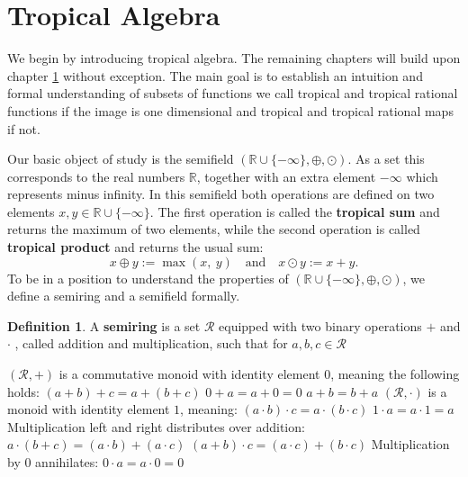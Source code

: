 \documentclass{article}
\theoremstyle{definition}
\newtheorem{definition}[theorem]{Definition}
\begin{document}
\section{Tropical Algebra}
\label{sec:trop_algebra}
We begin by introducing tropical algebra. The remaining chapters will build upon chapter \ref{sec:trop_algebra} without exception. The main goal is to establish an intuition and formal understanding of subsets of functions we call tropical and tropical rational functions if the image is one dimensional and tropical and tropical rational maps if not.

Our basic object of study is the semifield $( \mathbb{R} \cup \{- \infty \} , \oplus , \odot )$. As a set this corresponds to the real numbers $ \mathbb{R} $, together with an extra element $- \infty $ which represents minus infinity. In this semifield both operations are defined on two elements $x, y \in \mathbb{R} \cup \{- \infty \}$. The first operation is called the \textbf{tropical sum} and returns the maximum of two elements, while the second operation is called \textbf{tropical product} and returns the usual sum:
$$ x \oplus y := \max(x,\ y) \quad \text{and} \quad x \odot y := x+y.$$
To be in a position to understand the properties of $( \mathbb{R} \cup \{- \infty \} , \oplus , \odot )$, we define a semiring and a semifield formally.
\begin{definition}\cite{berstel1985theory}
A \textbf{semiring} is a set $\mathcal{R}$ equipped with two binary operations $+$ and $\cdot$ , called addition and multiplication, such that for $a, b, c \in \mathcal{R}$ \\
\begin{outline}
  \1 $(\mathcal{R}, +)$ is a commutative monoid with identity element 0, meaning the following holds:
    \2 $(a + b) + c = a + (b + c)$
    \2 $0 + a = a + 0 = 0$
    \2 $a + b = b + a$
  \1 $(\mathcal{R}, \cdot)$ is a monoid with identity element $1$, meaning:
    \2 $(a \cdot b) \cdot c = a \cdot (b \cdot c)$
    \2 $ 1 \cdot a = a \cdot 1 = a $
  \1 Multiplication left and right distributes over addition:
    \2 $ a \cdot (b + c) = (a \cdot b) + (a \cdot c)$
    \2 $ (a + b) \cdot c = (a \cdot c) + (b \cdot c)$
  \1 Multiplication by 0 annihilates:
    \2 $ 0 \cdot a = a \cdot 0 = 0$
\end{outline}
\end{definition}
\end{document}
